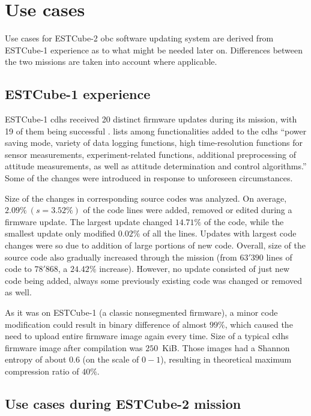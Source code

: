 \newpage
\section{Use cases}

Use cases for ESTCube-2 \gls{obc} software updating system are derived from ESTCube-1 experience as to what might be needed later on. Differences between the two missions are taken into account where applicable.

\subsection{ESTCube-1 experience}

ESTCube-1 \gls{cdhs} received 20 distinct firmware updates during its mission, with 19 of them being successful \cite{Suenter2016}. \textcite{Slavinskis2015} lists among functionalities added to the \gls{cdhs} ``power saving mode, variety of data logging functions, high time-resolution functions for sensor measurements, experiment-related functions, additional preprocessing of attitude measurements, as well as attitude determination and control algorithms.'' Some of the changes were introduced in response to unforeseen circumstances.

Size of the changes in corresponding source codes was analyzed. On average, $2.09\%\ (s=3.52\%)$ of the code lines were added, removed or edited during a firmware update. The largest update changed $14.71\%$ of the code, while the smallest update only modified $0.02\%$ of all the lines. Updates with largest code changes were so due to addition of large portions of new code. Overall, size of the source code also gradually increased through the mission (from $63'390$ lines of code to $78'868$, a $24.42\%$ increase). However, no update consisted of just new code being added, always some previously existing code was changed or removed as well.

As it was on ESTCube-1 (a classic nonsegmented firmware), a minor code modification could result in binary difference of almost $99\%$, which caused the need to upload entire firmware image again every time. Size of a typical \gls{cdhs} firmware image after compilation was $250$~KiB. Those images had a Shannon entropy of about $0.6$ (on the scale of $0-1$), resulting in theoretical maximum compression ratio of $40\%$. \cite{Suenter2016}

\subsection{Use cases during ESTCube-2 mission}

